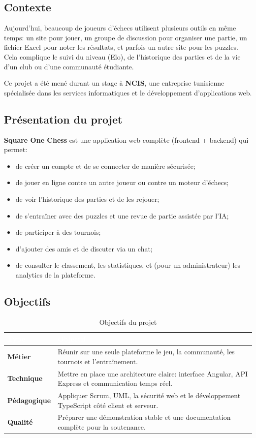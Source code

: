 \documentclass[12pt,a4paper,oneside]{article}
\begin{document}
\subsection{Contexte}
Aujourd'hui, beaucoup de joueurs d'échecs utilisent plusieurs outils en même temps:
un site pour jouer, un groupe de discussion pour organiser une partie, un fichier Excel pour noter les résultats, et parfois un autre site pour les puzzles.
Cela complique le suivi du niveau (Elo), de l'historique des parties et de la vie d'un club ou d'une communauté étudiante.

Ce projet a été mené durant un stage à \textbf{NCIS}, une entreprise tunisienne spécialisée dans les services informatiques et le développement d'applications web.

\subsection{Présentation du projet}
\textbf{Square One Chess} est une application web complète (frontend + backend) qui permet:
\begin{itemize}
  \item de créer un compte et de se connecter de manière sécurisée;
  \item de jouer en ligne contre un autre joueur ou contre un moteur d'échecs;
  \item de voir l'historique des parties et de les rejouer;
  \item de s'entraîner avec des puzzles et une revue de partie assistée par l'IA;
  \item de participer à des tournois;
  \item d'ajouter des amis et de discuter via un chat;
  \item de consulter le classement, les statistiques, et (pour un administrateur) les analytics de la plateforme.
\end{itemize}

\subsection{Objectifs}
\begin{table}[H]
\centering
\caption{Objectifs du projet}
\begin{tabularx}{\linewidth}{|>{\bfseries}l|X|}
\hline
\rowcolor{sectionblue}
\textcolor{white}{Type} & \textcolor{white}{\textbf{Objectif}} \\
\hline
Métier & Réunir sur une seule plateforme le jeu, la communauté, les tournois et l'entraînement. \\
\hline
Technique & Mettre en place une architecture claire: interface Angular, API Express et communication temps réel. \\
\hline
Pédagogique & Appliquer Scrum, UML, la sécurité web et le développement TypeScript côté client et serveur. \\
\hline
Qualité & Préparer une démonstration stable et une documentation complète pour la soutenance. \\
\hline
\end{tabularx}
\end{table}
\end{document}
